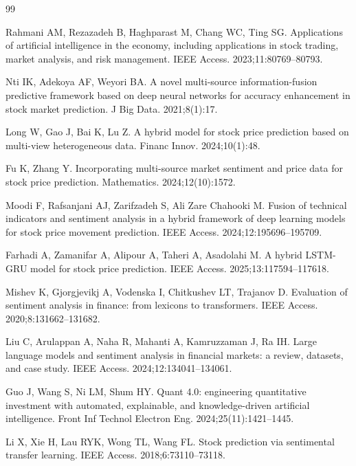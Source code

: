 \documentclass[12pt,a4paper]{article}
\begin{document}
\renewcommand{\refname}{}
\vspace{-2\baselineskip}   %
\begin{singlespace}
\begin{thebibliography}{99}

Rahmani AM, Rezazadeh B, Haghparast M, Chang WC, Ting SG. Applications
of artificial intelligence in the economy, including applications in stock
trading, market analysis, and risk management. IEEE Access.
2023;11:80769--80793.

Nti IK, Adekoya AF, Weyori BA. A novel multi-source information-fusion
predictive framework based on deep neural networks for accuracy enhancement
in stock market prediction. J Big Data. 2021;8(1):17.

Long W, Gao J, Bai K, Lu Z. A hybrid model for stock price prediction based
on multi-view heterogeneous data. Financ Innov. 2024;10(1):48.

Fu K, Zhang Y. Incorporating multi-source market sentiment and price data
for stock price prediction. Mathematics. 2024;12(10):1572.

Moodi F, Rafsanjani AJ, Zarifzadeh S, Ali Zare Chahooki M. Fusion of
technical indicators and sentiment analysis in a hybrid framework of deep
learning models for stock price movement prediction. IEEE Access.
2024;12:195696--195709.

Farhadi A, Zamanifar A, Alipour A, Taheri A, Asadolahi M. A hybrid
LSTM-GRU model for stock price prediction. IEEE Access.
2025;13:117594--117618.

Mishev K, Gjorgjevikj A, Vodenska I, Chitkushev LT, Trajanov D. Evaluation
of sentiment analysis in finance: from lexicons to transformers. IEEE Access.
2020;8:131662--131682.

Liu C, Arulappan A, Naha R, Mahanti A, Kamruzzaman J, Ra IH. Large language
models and sentiment analysis in financial markets: a review, datasets, and
case study. IEEE Access. 2024;12:134041--134061.

Guo J, Wang S, Ni LM, Shum HY. Quant 4.0: engineering quantitative
investment with automated, explainable, and knowledge-driven artificial
intelligence. Front Inf Technol Electron Eng. 2024;25(11):1421--1445.

Li X, Xie H, Lau RYK, Wong TL, Wang FL. Stock prediction via sentimental
transfer learning. IEEE Access. 2018;6:73110--73118.


\end{thebibliography}
\end{singlespace}
\end{document}
